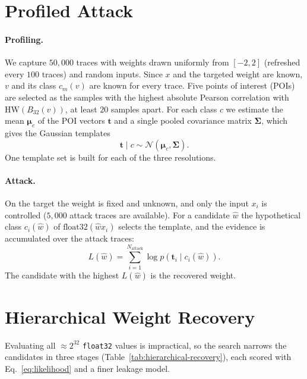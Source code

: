\section{Profiled Attack}
\label{sec:attack}

\paragraph{Profiling.}
We capture $50{,}000$ traces with weights drawn uniformly from $[-2,2]$
(refreshed every $100$ traces) and random inputs. Since $x$ and the
targeted weight are known, $v$ and its class $c_m(v)$ are known for every
trace. Five points of interest (POIs) are selected as the samples with
the highest absolute Pearson correlation with $\mathrm{HW}(B_{32}(v))$,
at least $20$ samples apart. For each class $c$ we estimate the mean
$\boldsymbol{\mu}_c$ of the POI vectors $\mathbf{t}$ and a single
pooled covariance matrix $\boldsymbol{\Sigma}$, which gives the Gaussian
templates
\begin{equation}
	\mathbf{t}\mid c\sim\mathcal{N}\left(\boldsymbol{\mu}_c,\boldsymbol{\Sigma}\right).
\end{equation}
One template set is built for each of the three resolutions.

\paragraph{Attack.}
On the target the weight is fixed and unknown, and only the input $x_i$
is controlled ($5{,}000$ attack traces are available). For a candidate
$\hat{w}$ the hypothetical class $c_i(\hat{w})$ of
$\mathrm{float32}(\hat{w}x_i)$ selects the template, and the evidence is
accumulated over the attack traces:
\begin{equation}
	L(\hat{w})=\sum_{i=1}^{N_{\mathrm{attack}}}\log p\left(\mathbf{t}_i\mid c_i(\hat{w})\right).
	\label{eq:likelihood}
\end{equation}
The candidate with the highest $L(\hat{w})$ is the recovered weight.

\section{Hierarchical Weight Recovery}
\label{sec:hierarchical-recovery}

Evaluating all $\approx 2^{32}$ \texttt{float32} values is impractical,
so the search narrows the candidates in three stages
(Table~\ref{tab:hierarchical-recovery}), each scored with
Eq.~\eqref{eq:likelihood} and a finer leakage model.

